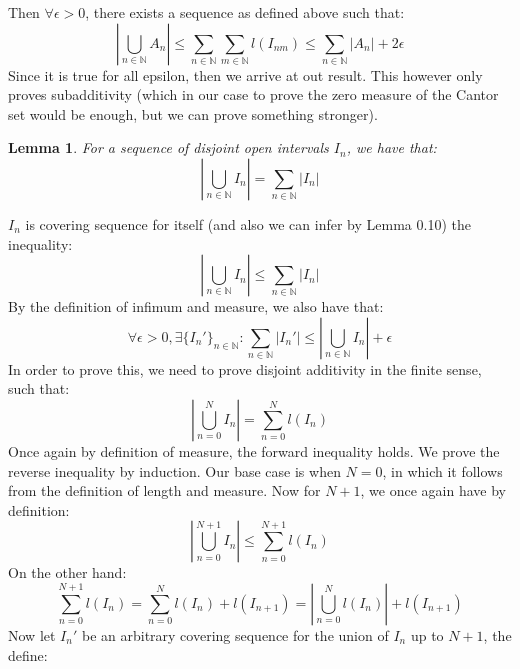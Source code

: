 \documentclass[10pt,letterpaper]{article} %
\newtheorem{lem}{Lemma}[section]
\begin{document}
Then $\forall \epsilon > 0$, there exists a sequence as defined above such that:
\begin{equation*}
    \left|\bigcup_{n \in \mathbb{N}}A_n\right| \leqslant \sum_{n \in \mathbb{N}}\sum_{m \in \mathbb{N}}l(I_{nm}) \leqslant \sum_{n \in \mathbb{N}}|A_n| + 2\epsilon
\end{equation*}
Since it is true for all epsilon, then we arrive at out result. This however only proves subadditivity (which in our case to prove the zero measure of the Cantor set would be enough, but we can prove something stronger).\\
\begin{lem}
For a sequence of disjoint open intervals $I_n$, we have that:
\begin{equation*}
  \left|\bigcup_{n \in \mathbb{N}}I_n\right| = \sum_{n \in \mathbb{N}}|I_n|
\end{equation*}
\end{lem}
$I_n$ is covering sequence for itself (and also we can infer by Lemma 0.10) the inequality:
\begin{equation*}
  \left|\bigcup_{n \in \mathbb{N}}I_n\right| \leqslant \sum_{n \in \mathbb{N}}|I_n|
\end{equation*}
By the definition of infimum and measure, we also have that:
\begin{equation*}
  \forall \epsilon > 0, \exists \{I_n'\}_{n \in \mathbb{N}}: \sum_{n \in \mathbb{N}}|I_n'| \leqslant \left|\bigcup_{n \in \mathbb{N}}I_n\right| + \epsilon
\end{equation*}
In order to prove this, we need to prove disjoint additivity in the finite sense, such that:
\begin{equation*}
  \left|\bigcup_{n = 0}^{N}I_n\right| = \sum_{n = 0}^{N}l(I_n)
\end{equation*}
Once again by definition of measure, the forward inequality holds. We prove the reverse inequality by induction. Our base case is when $N = 0$, in which it follows from the definition of length and measure. Now for $N+1$, we once again have by definition:
\begin{equation*}
  \left|\bigcup_{n = 0}^{N+1}I_n\right| \leqslant \sum_{n = 0}^{N+1}l(I_n)
\end{equation*}
On the other hand:
\begin{equation*}
  \sum_{n = 0}^{N+1}l(I_n) = \sum_{n = 0}^{N}l(I_n) + l(I_{n+1}) = \left|\bigcup_{n=0}^{N}l(I_n)\right| + l(I_{n+1})
\end{equation*}
Now let $I_n'$ be an arbitrary covering sequence for the union of $I_n$ up to $N+1$, the define:
\end{document}
